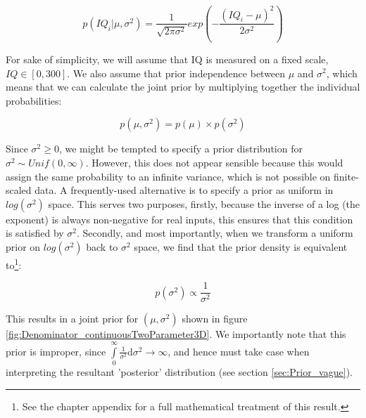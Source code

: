 \documentclass[11pt,fullpage]{book}
\begin{document}
\begin{equation}\label{eq:Denominator_continuousTwoParameterLikelihood}
p(IQ_i|\mu,\sigma^2) = \frac{1}{\sqrt{2\pi\sigma^2}} exp\left(-\frac{(IQ_i-\mu)^2}{2\sigma^2}\right)
\end{equation}

For sake of simplicity, we will assume that IQ is measured on a fixed scale, $IQ\in[0,300]$. We also assume that prior independence between $\mu$ and $\sigma^2$, which means that we can calculate the joint prior by multiplying together the individual probabilities:

\begin{equation}\label{sec:Denominator_continuousMultiparameterIndependence}
p(\mu,\sigma^2) = p(\mu) \times p(\sigma^2)
\end{equation}

Since $\sigma^2\geq 0$, we might be tempted to specify a prior distribution for $\sigma^2\sim Unif(0,\infty)$. However, this does not appear sensible because this would assign the same probability to an infinite variance, which is not possible on finite-scaled data. A frequently-used alternative is to specify a prior as uniform in $log(\sigma^2)$ space. This serves two purposes, firstly, because the inverse of a log (the exponent) is always non-negative for real inputs, this ensures that this condition is satisfied by $\sigma^2$. Secondly, and most importantly, when we transform a uniform prior on $log(\sigma^2)$ back to $\sigma^2$ space, we find that the prior density is equivalent to\footnote{See the chapter appendix for a full mathematical treatment of this result.}:

\begin{equation}\label{eq:Denominator_continuousTwoParameterPrior}
p(\sigma^2) \propto \frac{1}{\sigma^2}
\end{equation}

This results in a joint prior for $(\mu,\sigma^2)$ shown in figure \ref{fig:Denominator_continuousTwoParameter3D}. We importantly note that this prior is improper, since $\int\limits_{0}^{\infty} \frac{1}{\sigma^2}\mathrm{d}\sigma^2\rightarrow \infty$, and hence must take case when interpreting the resultant 'posterior' distribution (see section \ref{sec:Prior_vague}). 
\end{document}
